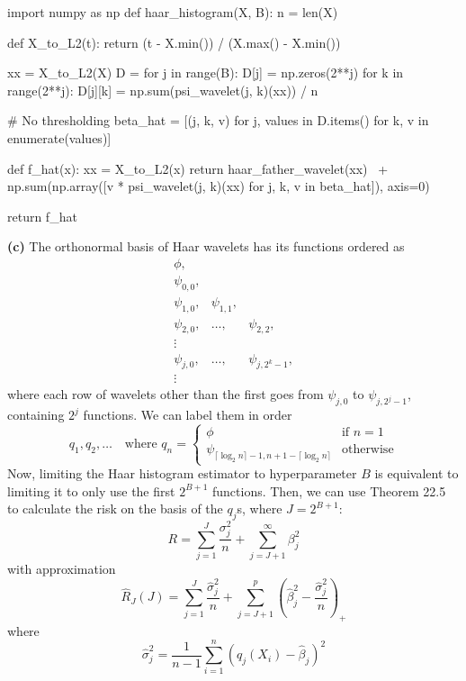 \begin{python}
import numpy as np
def haar_histogram(X, B): 
    n = len(X)
    
    def X_to_L2(t):
        return (t - X.min()) / (X.max() - X.min())
    
    xx = X_to_L2(X)
    D = {}
    for j in range(B):
        D[j] = np.zeros(2**j)
        for k in range(2**j):
            D[j][k] = np.sum(psi_wavelet(j, k)(xx)) / n
            
    # No thresholding
    beta_hat = [(j, k, v) for j, values in D.items() for k, v in enumerate(values)]
    
    def f_hat(x):
        xx = X_to_L2(x)
        return haar_father_wavelet(xx) \
            + np.sum(np.array([v * psi_wavelet(j, k)(xx) for j, k, v in beta_hat]), axis=0)
    
    return f_hat
\end{python}
\textbf{(c)} The orthonormal basis of Haar wavelets has its functions
ordered as
\[
\begin{array}{ccc}
\phi, \\
\psi_{0, 0}, \\
\psi_{1, 0}, & \psi_{1, 1}, \\
\psi_{2, 0}, & \dots, & \psi_{2, 2}, \\
\vdots \\
\psi_{j, 0}, & \dots, & \psi_{j, 2^{k} - 1}, \\
\vdots
\end{array}
\]
where each row of wavelets other than the first goes from
\(\psi_{j, 0}\) to \(\psi_{j, 2^{j} - 1}\), containing \(2^{j}\) functions.
We can label them in order
\[
q_{1}, q_{2}, \dots 
\quad \text{where }q_{n} = \begin{cases}
\phi & \text{if }  n = 1 \\
\psi_{\lceil \log_{2} n \rceil- 1, n + 1 - \lceil \log_{2} n \rceil } & \text{otherwise}
\end{cases}
\]
Now, limiting the Haar histogram estimator to hyperparameter \(B\) is
equivalent to limiting it to only use the first \(2^{B + 1}\) functions.
Then, we can use Theorem 22.5 to calculate the risk on the basis of the
\(q_{j}\)s, where \(J = 2^{B + 1}\):
\[
R = \sum_{j=1}^J \frac{\sigma_{j}^{2}}{n} + \sum_{j=J+1}^{\infty} \beta_{j}^{2}
\]
with approximation
\[
\hat{R}_J(J) = \sum_{j=1}^J \frac{\hat{\sigma}_{j}^{2}}{n} + \sum_{j=J+1}^p \left( \hat{\beta}_{j}^{2} - \frac{\hat{\sigma}_{j}^{2}}{n} \right)_{+}
\]
where
\[
\hat{\sigma}_{j}^{2} = \frac{1}{n - 1} \sum_{i=1}^{n} \left( q_{j}(X_{i}) - \hat{\beta}_{j}\right)^{2}
\]
